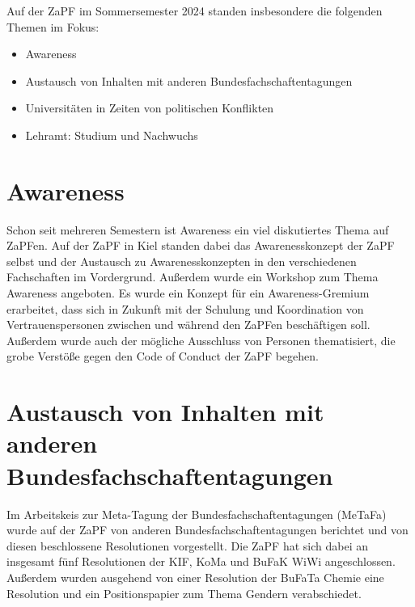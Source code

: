\documentclass{scrartcl}
\begin{document}
Auf der ZaPF im Sommersemester 2024 standen insbesondere die folgenden Themen im Fokus:
\begin{itemize}
\item Awareness
\item Austausch von Inhalten mit anderen Bundesfachschaftentagungen
\item Universitäten in Zeiten von politischen Konflikten
\item Lehramt: Studium und Nachwuchs
\end{itemize}

\section*{Awareness}
Schon seit mehreren Semestern ist Awareness ein viel diskutiertes Thema auf ZaPFen. Auf der ZaPF in Kiel standen dabei das Awarenesskonzept der ZaPF selbst und der Austausch zu Awarenesskonzepten in den verschiedenen Fachschaften im Vordergrund. Außerdem wurde ein Workshop zum Thema Awareness angeboten. Es wurde ein Konzept für ein Awareness-Gremium erarbeitet, dass sich in Zukunft mit der Schulung und Koordination von Vertrauenspersonen zwischen und während den ZaPFen beschäftigen soll. Außerdem wurde auch der mögliche Ausschluss von Personen thematisiert, die grobe Verstöße gegen den Code of Conduct der ZaPF begehen.

\section*{Austausch von Inhalten mit anderen Bundesfachschaftentagungen}
Im Arbeitskeis zur Meta-Tagung der Bundesfachschaftentagungen (MeTaFa) wurde auf der ZaPF von anderen Bundesfachschaftentagungen berichtet und von diesen beschlossene Resolutionen vorgestellt. Die ZaPF hat sich dabei an insgesamt fünf Resolutionen der KIF, KoMa und BuFaK WiWi angeschlossen. Außerdem wurden ausgehend von einer Resolution der BuFaTa Chemie eine Resolution und ein Positionspapier zum Thema Gendern verabschiedet.
\end{document}
